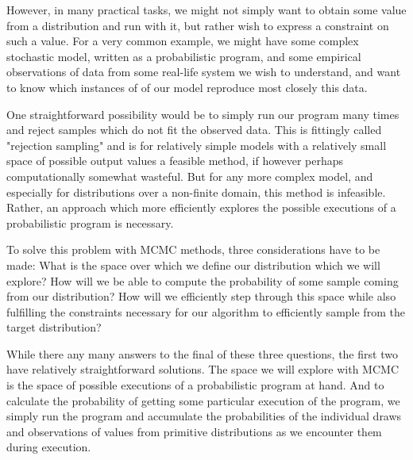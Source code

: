 However, in many practical tasks, we might not simply want to obtain some value from a distribution and run with it, but rather wish to express a constraint on such a value. For a very common example, we might have some complex stochastic model, written as a probabilistic program, and some empirical observations of data from some real-life system we wish to understand, and want to know which instances of of our model reproduce most closely this data.

One straightforward possibility would be to simply run our program many times and reject samples which do not fit the observed data. This is fittingly called "rejection sampling" and is for relatively simple models with a relatively small space of possible output values a feasible method, if however perhaps computationally somewhat wasteful. But for any more complex model, and especially for distributions over a non-finite domain, this method is infeasible. Rather, an approach which more efficiently explores the possible executions of a probabilistic program is necessary.

To solve this problem with MCMC methods, three considerations have to be made: What is the space over which we define our distribution which we will explore? How will we be able to compute the probability of some sample coming from our distribution? How will we efficiently step through this space while also fulfilling the constraints necessary for our algorithm to efficiently sample from the target distribution?

While there any many answers to the final of these three questions, the first two have relatively straightforward solutions. The space we will explore with MCMC is the space of possible executions of a probabilistic program at hand. And to calculate the probability of getting some particular execution of the program, we simply run the program and accumulate the probabilities of the individual draws and observations of values from primitive distributions as we encounter them during execution.
